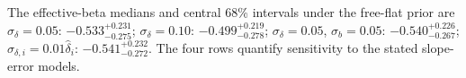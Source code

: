 The effective-beta medians and central 68\% intervals under the free-flat prior are $\sigma_\delta=0.05$: $-0.533_{-0.275}^{+0.231}$; $\sigma_\delta=0.10$: $-0.499_{-0.278}^{+0.219}$; $\sigma_\delta=0.05$, $\sigma_b=0.05$: $-0.540_{-0.267}^{+0.226}$; $\sigma_{\delta,i}=0.01\widehat\delta_i$: $-0.541_{-0.272}^{+0.232}$. The four rows quantify sensitivity to the stated slope-error models.
